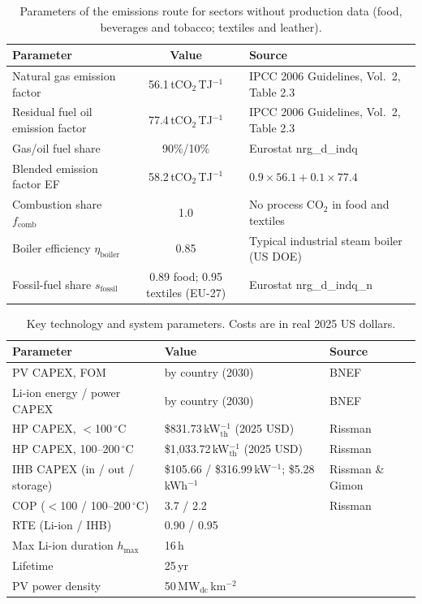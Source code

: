 \documentclass[11pt]{article}
\begin{document}
\begin{table}[h]
\centering
\small
\caption{Parameters of the emissions route for sectors without production data (food, beverages and tobacco; textiles and leather).}
\label{tab:ef}
\begin{tabular}{p{4.6cm} c p{6.4cm}}
\toprule
Parameter & Value & Source \\
\midrule
Natural gas emission factor & 56.1\,tCO$_2$\,TJ$^{-1}$ & IPCC 2006 Guidelines, Vol.~2, Table 2.3\cite{ipcc2006stationary} \\
Residual fuel oil emission factor & 77.4\,tCO$_2$\,TJ$^{-1}$ & IPCC 2006 Guidelines, Vol.~2, Table 2.3\cite{ipcc2006stationary} \\
Gas/oil fuel share & 90\%/10\% & Eurostat nrg\_d\_indq\cite{eurostat_nrg_d_indq} \\
Blended emission factor EF & 58.2\,tCO$_2$\,TJ$^{-1}$ & $0.9\times56.1+0.1\times77.4$ \\
Combustion share $f_{\mathrm{comb}}$ & 1.0 & No process CO$_2$ in food and textiles \\
Boiler efficiency $\eta_{\mathrm{boiler}}$ & 0.85 & Typical industrial steam boiler (US DOE) \\
Fossil-fuel share $s_{\mathrm{fossil}}$ & 0.89 food; 0.95 textiles (EU-27) & Eurostat nrg\_d\_indq\_n\cite{eurostat_nrg_d_indq_n} \\
\bottomrule
\end{tabular}
\end{table}

\begin{table}[h]
\centering
\caption{Key technology and system parameters. Costs are in real 2025 US dollars.}
\label{tab:params}
\begin{tabular}{l l l}
\toprule
Parameter & Value & Source \\
\midrule
PV CAPEX, FOM & by country (2030) & BNEF \\
Li-ion energy / power CAPEX & by country (2030) & BNEF \\
HP CAPEX, $<$100\,$^\circ$C & \$831.73\,kW$_{\mathrm{th}}^{-1}$ (2025 USD) & Rissman \\
HP CAPEX, 100--200\,$^\circ$C & \$1,033.72\,kW$_{\mathrm{th}}^{-1}$ (2025 USD) & Rissman \\
IHB CAPEX (in / out / storage) & \$105.66 / \$316.99\,kW$^{-1}$; \$5.28\,kWh$^{-1}$ & Rissman \& Gimon \\
COP ($<$100 / 100--200\,$^\circ$C) & 3.7 / 2.2 & Rissman \\
RTE (Li-ion / IHB) & 0.90 / 0.95 & \\
Max Li-ion duration $h_{\max}$ & 16\,h & \\
Lifetime & 25\,yr & \\
PV power density & 50\,MW$_{\mathrm{dc}}$\,km$^{-2}$ & \\
\bottomrule
\end{tabular}
\end{table}
\end{document}
